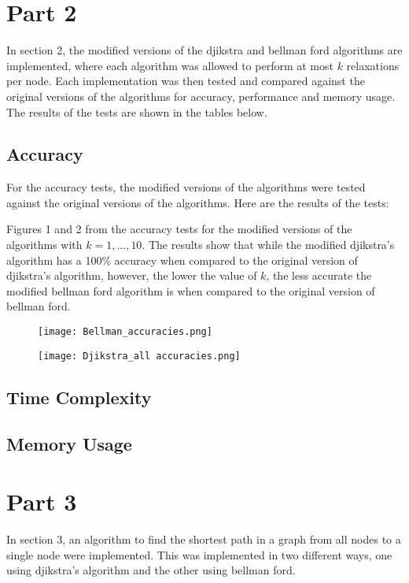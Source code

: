 \documentclass[12pt]{article}
\begin{document}
\section*{Part 2}
In section 2, the modified versions of the djikstra and bellman ford algorithms are implemented, where each algorithm was allowed to perform at most $k$ relaxations per node. Each implementation
was then tested and compared against the original versions of the algorithms for accuracy, performance and memory usage. The results of the tests are shown in the tables below.

\subsection*{Accuracy}

For the accuracy tests, the modified versions of the algorithms were tested against the original versions of the algorithms.
Here are the results of the tests:

Figures 1 and 2 from the accuracy tests for the modified versions of the algorithms with $k=1,...,10$.
The results show that while the modified djikstra's algorithm has a 100\% accuracy when compared to the original version of djikstra's algorithm,
however, the lower the value of $k$, the less accurate the modified bellman ford algorithm is when compared to the original version of bellman ford.

\begin{figure}[H]
    \centering
    \begin{minipage}{0.495\textwidth}
        \centering
        \texttt{[image: Bellman\_accuracies.png]}
    \end{minipage}
    \hfill
    \begin{minipage}{0.495\textwidth}
        \centering
        \texttt{[image: Djikstra\_all accuracies.png]}
    \end{minipage}
\end{figure}


\subsection*{Time Complexity}

\subsection*{Memory Usage}

\section*{Part 3}
In section 3, an algorithm to find the shortest path in a graph from all nodes to a single node were implemented. 
This was implemented in two different ways, one using djikstra's algorithm and the other using bellman ford.
\end{document}
